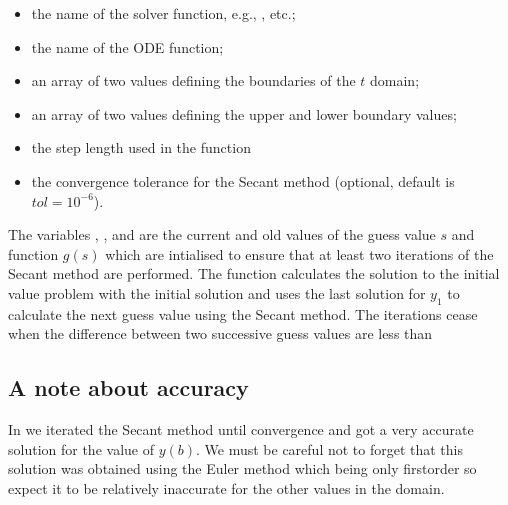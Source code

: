 \documentclass[letterpaper,10pt,english]{jupyterBook}
\begin{document}
\begin{itemize}
\item {} 
\sphinxAtStartPar
{} \sphinxhyphen{} the name of the solver function, e.g., ,  etc.;

\item {} 
\sphinxAtStartPar
{} \sphinxhyphen{} the name of the ODE function;

\item {} 
\sphinxAtStartPar
{} \sphinxhyphen{} an array of two values defining the boundaries of the \(t\) domain;

\item {} 
\sphinxAtStartPar
{} \sphinxhyphen{} an array of two values defining the upper and lower boundary values;

\item {} 
\sphinxAtStartPar
{} \sphinxhyphen{} the step length used in the  function

\item {} 
\sphinxAtStartPar
{} \sphinxhyphen{} the convergence tolerance for the Secant method (optional, default is \(tol=10^{-6}\)).

\end{itemize}

\sphinxAtStartPar
The variables , ,  and  are the current and old values of the guess value \(s\) and function \(g(s)\) which are intialised to ensure that at least two iterations of the Secant method are performed. The function calculates the solution to the initial value problem with the initial solution \sphinxcode{\sphinxupquote{{[}bvals{[}0{]}, s{]}}} and uses the last solution for \(y_1\) to calculate the next guess value using the Secant method. The iterations cease when the difference between two successive guess values are less than 


\subsection{A note about accuracy}
\label{\detokenize{5_BVPs/5.1_Shooting_method:a-note-about-accuracy}}
\sphinxAtStartPar
In {\hyperref[\detokenize{5_BVPs/5.1_Shooting_method:secant-method-example}]{}} we iterated the Secant method until convergence and got a very accurate solution for the value of \(y(b)\). We must be careful not to forget that this solution was obtained using the Euler method which being only first\sphinxhyphen{}order so expect it to be relatively inaccurate for the other values in the domain.
\end{document}
